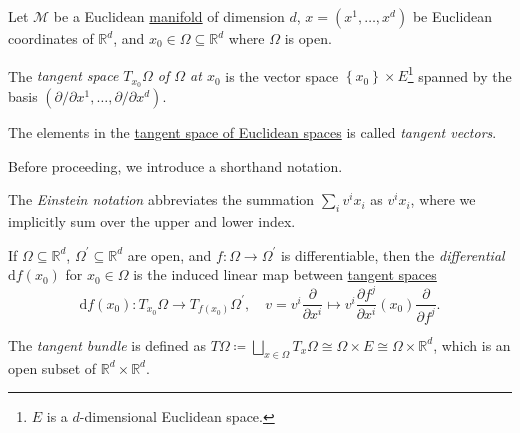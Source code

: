\begin{definition*}
	Let \(\mathcal{M} \) be a Euclidean \hyperref[def:topological-manifold]{manifold} of dimension \(d\), \(x = (x^1, \dots , x^d)\) be Euclidean coordinates of \(\mathbb{R} ^d\), and \(x_0\in \Omega \subseteq \mathbb{R} ^d\) where \(\Omega \) is open.
	\begin{definition}\label{def:tangent-space-of-Euclidean-space}
		The \emph{tangent space \(T_{x_0}\Omega \) of \(\Omega \) at \(x_0\)} is the vector space \(\left\{ x_0 \right\} \times E\)\footnote{\(E\) is a \(d\)-dimensional Euclidean space.} spanned by the basis \((\partial / \partial x^1, \dots , \partial / \partial x^d)\).
	\end{definition}
	\begin{definition}\label{def:tangent-vector-of-Euclidean-space}
		The elements in the \hyperref[def:tangent-space-of-Euclidean-space]{tangent space of Euclidean spaces} is called \emph{tangent vectors}.
	\end{definition}
\end{definition*}

Before proceeding, we introduce a shorthand notation.

\begin{notation}
	The \emph{Einstein notation} abbreviates the summation \(\sum_{i} v^i x_i\) as \(v^i x_i\), where we implicitly sum over the upper and lower index.
\end{notation}

\begin{definition}\label{def:differential-of-Euclidean-space}
	If \(\Omega \subseteq \mathbb{R} ^d\), \(\Omega ^\prime \subseteq \mathbb{R} ^d\) are open, and \(f\colon \Omega \to \Omega ^\prime \) is differentiable, then the \emph{differential} \(\mathrm{d} f(x_0)\) for \(x_0 \in \Omega \) is the induced linear map between \hyperref[def:tangent-space-of-Euclidean-space]{tangent spaces}
	\[
		\mathrm{d} f(x_0) \colon T_{x_0}\Omega \to T_{f(x_0)}\Omega ^\prime,\quad
		v = v^i \frac{\partial }{\partial x^i} \mapsto v^i \frac{\partial f^j}{\partial x^i} (x_0) \frac{\partial }{\partial f^j}.
	\]
\end{definition}

\begin{definition}\label{def:tangent-bundle-of-Euclidean-space}
	The \emph{tangent bundle} is defined as \(T \Omega\coloneqq \bigsqcup_{x\in \Omega }T_x \Omega \cong \Omega \times E \cong \Omega \times \mathbb{R} ^d\), which is an open subset of \(\mathbb{R} ^d \times \mathbb{R} ^d\).
\end{definition}

